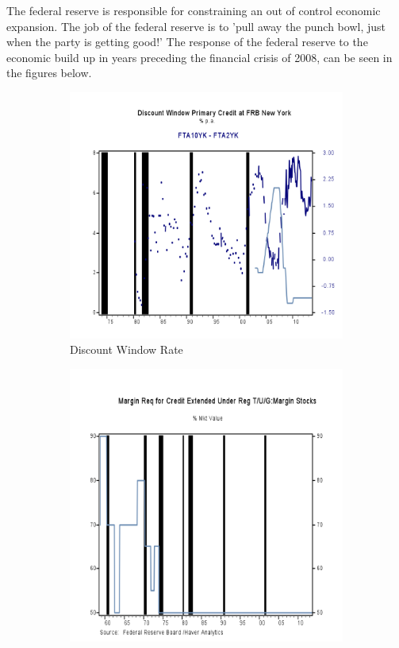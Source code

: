 The federal reserve is responsible for constraining an out of control economic expansion.  The job of the federal reserve is to 'pull away the punch bowl, just when the party is getting good!'  The response of the federal reserve to the economic build up in years preceding the financial crisis of 2008, can be seen in the figures below.

\begin{figure}[H]
\centering
\begin{subfigure}{.5\textwidth}
  \centering
  \includegraphics[width=1.0\linewidth]{figure/DiscountWindow.png}
  \caption{Discount Window Rate}%
  \label{fig:discountW}
\end{subfigure}%
\begin{subfigure}{.5\textwidth}
  \centering
  \includegraphics[width=1.0\linewidth]{figure/MarginStocks.png}

\end{subfigure}
\end{figure}
